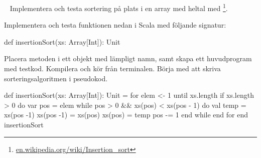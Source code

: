 
\QUESTBEGIN

\Task  \what~ Implementera och testa sortering på plats i en array med heltal med \footnote{\href{https://en.wikipedia.org/wiki/Insertion_sort}{en.wikipedia.org/wiki/Insertion\_sort}}.

Implementera och testa funktionen nedan i Scala med följande signatur:
\begin{Code}
  def insertionSort(xs: Array[Int]): Unit
\end{Code}
Placera metoden i ett objekt med lämpligt namn, samt skapa ett huvudprogram med testkod. Kompilera och kör från terminalen. Börja med att skriva sorteringsalgoritmen i pseudokod.


\SOLUTION


\TaskSolved \what


\begin{Code}
def insertionSort(xs: Array[Int]): Unit = 
  for elem <- 1 until xs.length if xs.length > 0 do
    var pos = elem
    while pos > 0 && xs(pos) < xs(pos - 1) do
      val temp = xs(pos -1)
      xs(pos -1) = xs(pos)
      xs(pos) = temp
      pos -= 1
    end while
  end for
end insertionSort
\end{Code}








\QUESTEND



